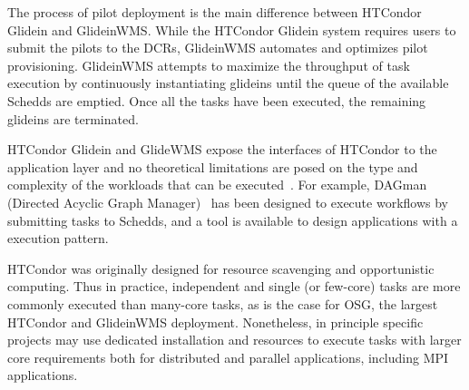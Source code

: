 \documentclass{sig-alternate}
\begin{document}
The process of pilot deployment is the main difference between HTCondor Glidein
and GlideinWMS. While the HTCondor Glidein system requires users to submit the
pilots to the DCRs, GlideinWMS automates and optimizes pilot provisioning.
GlideinWMS attempts to maximize the throughput of task execution by continuously
instantiating glideins until the queue of the available Schedds are emptied.
Once all the tasks have been executed, the remaining glideins are terminated.


HTCondor Glidein and GlideWMS expose the interfaces of HTCondor to the
application layer and no theoretical limitations are posed on the type and
complexity of the workloads that can be executed~\cite{couvares2007workflow}.
For example, DAGman (Directed Acyclic Graph Manager)~\cite{frey2002condor} has
been designed to execute workflows by submitting tasks to Schedds, and a \MW
tool is available to design applications with a \MW execution pattern.




HTCondor was originally designed for resource scavenging and opportunistic
computing.  Thus in practice, independent and single (or few-core) tasks are
more commonly executed than many-core tasks, as is the case for OSG, the largest
HTCondor and GlideinWMS deployment. Nonetheless, in principle specific projects
may use dedicated installation and resources to execute tasks with larger core
requirements both for distributed and parallel applications, including MPI
applications.

\end{document}
